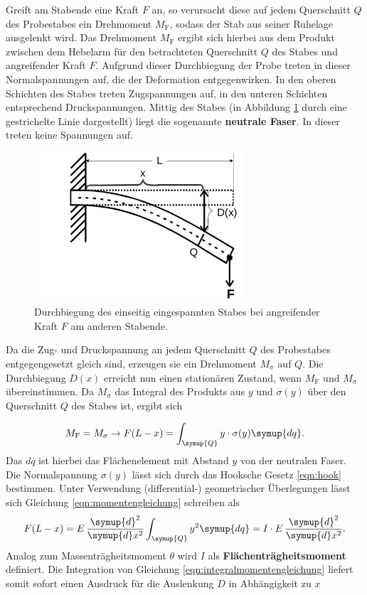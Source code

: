 Greift am Stabende eine Kraft $F$ an, so verursacht diese auf jedem Querschnitt $Q$ des Probestabes ein Drehmoment $M_{\mathrm{F}}$, sodass der Stab aus seiner Ruhelage ausgelenkt wird. Das Drehmoment $M_{\mathrm{F}}$ ergibt sich hierbei aus dem Produkt zwischen dem Hebelarm für den betrachteten Querschnitt $Q$ des Stabes und angreifender Kraft $F$.
Aufgrund dieser Durchbiegung der Probe treten in dieser Normalspannungen auf, die der Deformation entgegenwirken.
In den oberen Schichten des Stabes treten Zugspannungen auf, in den unteren Schichten entsprechend Druckspannungen.
Mittig des Stabes (in Abbildung \ref{fig:Durchbiegung} durch eine gestrichelte Linie dargestellt) liegt die sogenannte \textbf{neutrale Faser}. In dieser treten keine Spannungen auf.
\begin{figure}
	\centering
	\includegraphics[width=0.7\textwidth]{Bilder/durchbiegungstab.png}
	\caption{Durchbiegung des einseitig eingespannten Stabes bei angreifender Kraft $F$ am anderen Stabende. \cite{Anleitung}}
	\label{fig:Durchbiegung}
\end{figure}
Da die Zug- und Druckspannung an jedem Querschnitt $Q$ des Probestabes entgegengesetzt gleich sind, erzeugen sie ein Drehmoment $M_{\mathrm{\sigma}}$ auf $Q$.
Die Durchbiegung $D(x)$ erreicht nun einen stationären Zustand, wenn $M_{\mathrm{F}}$ und $M_{\mathrm{\sigma}}$ übereinstimmen.
Da $M_{\mathrm{\sigma}}$ das Integral des Produkts aus $y$ und $\sigma(y)$ über den Querschnitt $Q$ des Stabes ist, ergibt sich

\begin{equation}
	\label{eqn:momentengleichung}
	M_{\mathrm{F}}=M_{\mathrm{\sigma}} \rightarrow F(L-x)=\int_{\symup{Q}}^{} y \cdot \sigma(y) \symup{dq} \mathrm{.}
\end{equation}
Das $dq$ ist hierbei das Flächenelement mit Abstand $y$ von der neutralen Faser.
Die Normalspannung $\sigma(y)$ lässt sich durch das Hooksche Gesetz \eqref{eqn:hook} bestimmen.
Unter Verwendung (differential-) geometrischer Überlegungen lässt sich Gleichung \eqref{eqn:momentengleichung} schreiben als
\begin{equation}
	\label{eqn:integralmomentengleichung}
	F(L-x)=E \, \frac{\symup{d}^2}{\symup{d}x^2} \int_{\symup{Q}}^{} y^2 \symup{dq}=I \cdot E\, \frac{\symup{d}^2}{\symup{d}x^2} \mathrm{.}
\end{equation}
Analog zum Massenträgheitsmoment $\theta$ wird $I$ als \textbf{Flächenträgheitsmoment} definiert.
Die Integration von Gleichung  \eqref{eqn:integralmomentengleichung} liefert somit sofort einen Ausdruck für die Auslenkung $D$ in Abhängigkeit zu $x$

